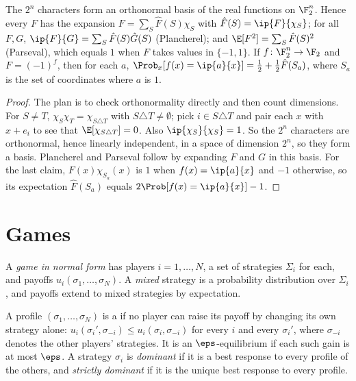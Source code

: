 \begin{refsection}
\begin{theorem}\label{thm:toolkit:parseval}
The $2^n$ characters form an orthonormal basis of the real functions on $\F_2^n$. Hence every $F$ has the expansion $F=\sum_S\hat F(S)\chi_S$ with $\hat F(S)=\ip{F}{\chi_S}$; for all $F,G$, $\ip{F}{G}=\sum_S\hat F(S)\hat G(S)$ (Plancherel); and $\E[F^2]=\sum_S\hat F(S)^2$ (Parseval), which equals $1$ when $F$ takes values in $\{-1,1\}$. If $f\colon\F_2^n\to\F_2$ and $F=(-1)^f$, then for each $a$, $\Prob_x[f(x)=\ip{a}{x}]=\frac12+\frac12\hat F(S_a)$, where $S_a$ is the set of coordinates where $a$ is $1$.
\end{theorem}

\begin{proof}
The plan is to check orthonormality directly and then count dimensions. For $S\ne T$, $\chi_S\chi_T=\chi_{S\triangle T}$ with $S\triangle T\ne\emptyset$; pick $i\in S\triangle T$ and pair each $x$ with $x+e_i$ to see that $\E[\chi_{S\triangle T}]=0$. Also $\ip{\chi_S}{\chi_S}=1$. So the $2^n$ characters are orthonormal, hence linearly independent, in a space of dimension $2^n$, so they form a basis. Plancherel and Parseval follow by expanding $F$ and $G$ in this basis. For the last claim, $F(x)\chi_{S_a}(x)$ is $1$ when $f(x)=\ip{a}{x}$ and $-1$ otherwise, so its expectation $\hat F(S_a)$ equals $2\Prob[f(x)=\ip{a}{x}]-1$.
\end{proof}

\section{Games}\label{sec:toolkit:games}

A \emph{game in normal form} has players $i=1,\dots,N$, a set of strategies $\Sigma_i$ for each, and payoffs $u_i(\sigma_1,\dots,\sigma_N)$. A \emph{mixed} strategy is a probability distribution over $\Sigma_i$, and payoffs extend to mixed strategies by expectation.

\begin{definition}[Equilibria]\label{def:toolkit:nash}
A profile $(\sigma_1,\dots,\sigma_N)$ is a  if no player can raise its payoff by changing its own strategy alone: $u_i(\sigma_i',\sigma_{-i})\le u_i(\sigma_i,\sigma_{-i})$ for every $i$ and every $\sigma_i'$, where $\sigma_{-i}$ denotes the other players' strategies. It is an $\eps$-equilibrium if each such gain is at most $\eps$. A strategy $\sigma_i$ is \emph{dominant} if it is a best response to every profile of the others, and \emph{strictly dominant} if it is the unique best response to every profile.
\end{definition}


\end{refsection}
